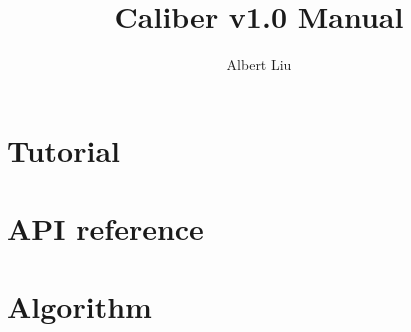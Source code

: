 \documentclass{article}
\title{Caliber v1.0 Manual}
\author{Albert Liu}
\begin{document}
\maketitle
\tableofcontents
\newpage
\part{Tutorial}


% 


\part{API reference}









\part{Algorithm}






%
%
\end{document}
